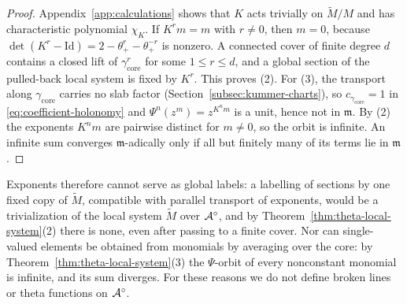 \begin{proof}
Appendix~\ref{app:calculations} shows that $K$ acts trivially on
$\widetilde M/M$ and has characteristic polynomial $\chi_K$.  If $K^rm=m$
with $r\neq0$, then $m=0$, because
$\det(K^r-\mathrm{Id})=2-\theta_+^r-\theta_+^{-r}$ is nonzero.  A connected
cover of finite degree $d$ contains a closed lift of
$\gamma_{\mathrm{core}}^r$ for some $1\leq r\leq d$, and a global section of
the pulled-back local system is fixed by $K^r$.  This proves (2).  For (3),
the transport along $\gamma_{\mathrm{core}}$ carries no slab factor
(Section~\ref{subsec:kummer-charts}), so $c_{\gamma_{\mathrm{core}}}=1$ in
\eqref{eq:coefficient-holonomy} and $\Psi^n(z^m)=z^{K^nm}$ is a unit, hence
not in $\mathfrak m$.  By (2) the exponents $K^nm$ are pairwise distinct for $m\neq0$,
so the orbit is infinite.  An infinite sum converges $\mathfrak m$-adically only if
all but finitely many of its terms lie in $\mathfrak m$.
\end{proof}

Exponents therefore cannot serve as global labels: a labelling of sections
by one fixed copy of $\widetilde M$, compatible with parallel transport of
exponents, would be a trivialization of the local system $\widetilde M$ over
$\mathcal A^\circ$, and by Theorem~\ref{thm:theta-local-system}(2) there is none,
even after passing to a finite cover.  Nor can single-valued elements be
obtained from monomials by averaging over the core: by
Theorem~\ref{thm:theta-local-system}(3) the $\Psi$-orbit of every
nonconstant monomial is infinite, and its sum diverges.  For these reasons
we do not define broken lines or theta functions on $\mathcal A^\circ$.

